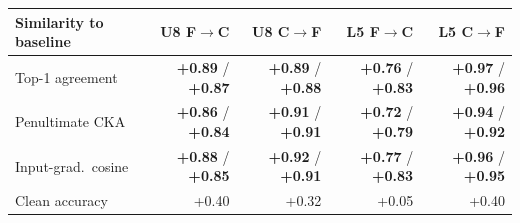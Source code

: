 \begin{tabular}{lrrrr}
\toprule
Similarity to baseline & U8 F$\to$C & U8 C$\to$F & L5 F$\to$C & L5 C$\to$F \\
\midrule
Top-1 agreement & \textbf{+0.89} / \textbf{+0.87} & \textbf{+0.89} / \textbf{+0.88} & \textbf{+0.76} / \textbf{+0.83} & \textbf{+0.97} / \textbf{+0.96} \\
Penultimate CKA & \textbf{+0.86} / \textbf{+0.84} & \textbf{+0.91} / \textbf{+0.91} & \textbf{+0.72} / \textbf{+0.79} & \textbf{+0.94} / \textbf{+0.92} \\
Input-grad.\ cosine & \textbf{+0.88} / \textbf{+0.85} & \textbf{+0.92} / \textbf{+0.91} & \textbf{+0.77} / \textbf{+0.83} & \textbf{+0.96} / \textbf{+0.95} \\
Clean accuracy & +0.40 & +0.32 & +0.05 & +0.40 \\
\bottomrule
\end{tabular}

